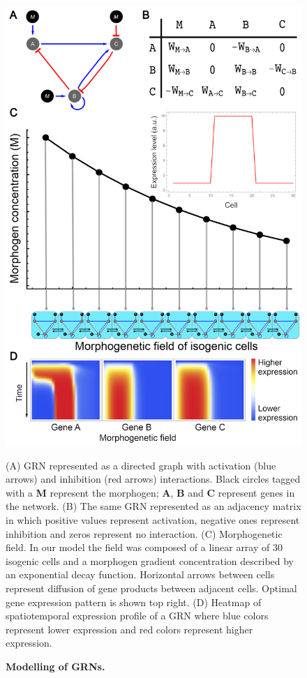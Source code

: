\documentclass[10pt,letterpaper]{article}
\begin{document}
\begin{figure}[!h]
 \includegraphics[width=\textwidth]{figures/metodos/Fig1}
    \caption{\bf Modelling of GRNs.}
    (A) GRN represented as a directed graph with activation (blue arrows) and
    inhibition (red arrows) interactions. Black circles
    tagged with a \textbf{M} represent the morphogen; \textbf{A}, \textbf{B} and
    \textbf{C} represent genes in the network.
    (B) The same GRN represented as an adjacency matrix in which positive values
    represent activation, negative ones represent inhibition and
    zeros represent no interaction.
    (C) Morphogenetic field. In our model the field was composed of a linear
    array of 30 isogenic cells and a morphogen gradient concentration described
    by an exponential decay function. Horizontal arrows between cells represent
    diffusion of gene products between adjacent cells. Optimal gene expression
    pattern is shown top right.
    (D) Heatmap of spatiotemporal expression profile of a GRN where blue
    colors represent lower expression and red colors represent higher
    expression.
 \label{fig:model}
\end{figure}
\end{document}
